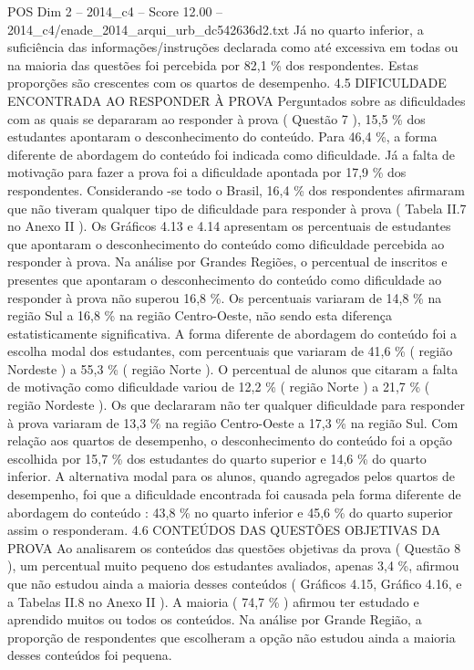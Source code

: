 \begin{textsample}{POS Dim 2 – 2014\_c4 – Score 12.00 – 2014\_c4/enade\_2014\_arqui\_urb\_dc542636d2.txt}
Já no quarto inferior, a suficiência das informações/instruções declarada como até excessiva em todas ou na maioria das questões foi percebida por 82,1 \% dos respondentes.
Estas proporções são crescentes com os quartos de desempenho. 4.5 DIFICULDADE ENCONTRADA AO RESPONDER À PROVA Perguntados sobre as dificuldades com as quais se depararam ao responder à prova ( Questão 7 ), 15,5 \% dos estudantes apontaram o desconhecimento do conteúdo.
Para 46,4 \%, a forma diferente de abordagem do conteúdo foi indicada como dificuldade.
Já a falta de motivação para fazer a prova foi a dificuldade apontada por 17,9 \% dos respondentes.
Considerando -se todo o Brasil, 16,4 \% dos respondentes afirmaram que não tiveram qualquer tipo de dificuldade para responder à prova ( Tabela II.7 no Anexo II ).
Os Gráficos 4.13 e 4.14 apresentam os percentuais de estudantes que apontaram o desconhecimento do conteúdo como dificuldade percebida ao responder à prova.
Na análise por Grandes Regiões, o percentual de inscritos e presentes que apontaram o desconhecimento do conteúdo como dificuldade ao responder à prova não superou 16,8 \%.
Os percentuais variaram de 14,8 \% na região Sul a 16,8 \% na região Centro-Oeste, não sendo esta diferença estatisticamente significativa.
A forma diferente de abordagem do conteúdo foi a escolha modal dos estudantes, com percentuais que variaram de 41,6 \% ( região Nordeste ) a 55,3 \% ( região Norte ).
O percentual de alunos que citaram a falta de motivação como dificuldade variou de 12,2 \% ( região Norte ) a 21,7 \% ( região Nordeste ).
Os que declararam não ter qualquer dificuldade para responder à prova variaram de 13,3 \% na região Centro-Oeste a 17,3 \% na região Sul.
Com relação aos quartos de desempenho, o desconhecimento do conteúdo foi a opção escolhida por 15,7 \% dos estudantes do quarto superior e 14,6 \% do quarto inferior.
A alternativa modal para os alunos, quando agregados pelos quartos de desempenho, foi que a dificuldade encontrada foi causada pela forma diferente de abordagem do conteúdo : 43,8 \% no quarto inferior e 45,6 \% do quarto superior assim o responderam. 4.6 CONTEÚDOS DAS QUESTÕES OBJETIVAS DA PROVA Ao analisarem os conteúdos das questões objetivas da prova ( Questão 8 ), um percentual muito pequeno dos estudantes avaliados, apenas 3,4 \%, afirmou que não estudou ainda a maioria desses conteúdos ( Gráficos 4.15, Gráfico 4.16, e a Tabelas II.8 no Anexo II ).
A maioria ( 74,7 \% ) afirmou ter estudado e aprendido muitos ou todos os conteúdos.
Na análise por Grande Região, a proporção de respondentes que escolheram a opção não estudou ainda a maioria desses conteúdos foi pequena.

\end{textsample}
